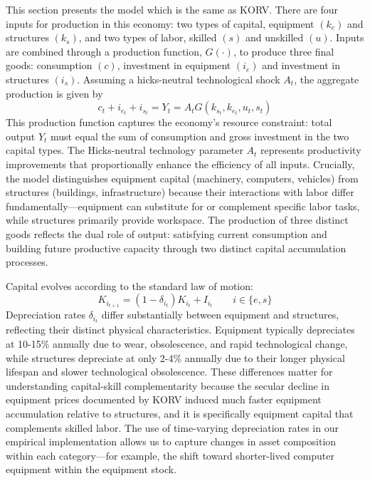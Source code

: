 \documentclass[12pt]{article}
\begin{document}
This section presents the model which is the same as KORV. There are four inputs for production in this economy: two types of capital, equipment $(k_e)$ and structures $(k_s)$, and two types of labor, skilled $(s)$ and unskilled $(u)$. Inputs are combined through a production function, $G(\cdot)$, to produce three final goods: consumption $(c)$, investment in equipment $(i_e)$ and investment in structures $(i_s)$. Assuming a hicks-neutral technological shock $A_t$, the aggregate production is given by
\begin{equation}\label{eq:production}
 c_t + i_{e_t} + i_{s_t} = Y_t = A_t G(k_{s_t}, k_{e_t}, u_t, s_t)
\end{equation}
This production function captures the economy's resource constraint: total output $Y_t$ must equal the sum of consumption and gross investment in the two capital types. The Hicks-neutral technology parameter $A_t$ represents productivity improvements that proportionally enhance the efficiency of all inputs. Crucially, the model distinguishes equipment capital (machinery, computers, vehicles) from structures (buildings, infrastructure) because their interactions with labor differ fundamentally---equipment can substitute for or complement specific labor tasks, while structures primarily provide workspace. The production of three distinct goods reflects the dual role of output: satisfying current consumption and building future productive capacity through two distinct capital accumulation processes.

Capital evolves according to the standard law of motion:
\begin{equation}\label{eq:capital_law_motion}
 K_{i_{t+1}} = (1 - \delta_{i_t}) K_{i_{t}} + I_{i_{t}} \qquad i\in\{e, s\}
\end{equation}
Depreciation rates $\delta_{i_t}$ differ substantially between equipment and structures, reflecting their distinct physical characteristics. Equipment typically depreciates at 10-15\% annually due to wear, obsolescence, and rapid technological change, while structures depreciate at only 2-4\% annually due to their longer physical lifespan and slower technological obsolescence. These differences matter for understanding capital-skill complementarity because the secular decline in equipment prices documented by KORV induced much faster equipment accumulation relative to structures, and it is specifically equipment capital that complements skilled labor. The use of time-varying depreciation rates in our empirical implementation allows us to capture changes in asset composition within each category---for example, the shift toward shorter-lived computer equipment within the equipment stock.
\end{document}
